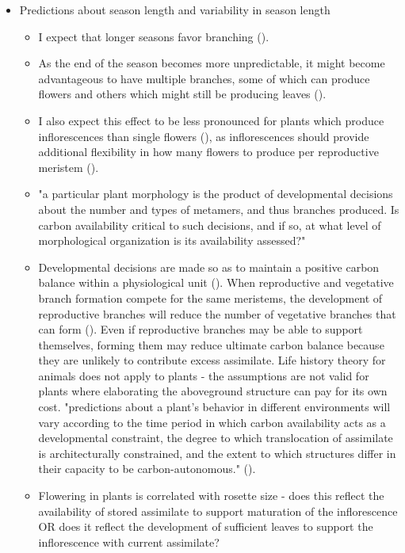 \documentclass[12pt, oneside,titlepage]{article}   	%
\begin{document}
\begin{itemize}
\item Predictions about season length and variability in season length
\begin{itemize}
\item I expect that longer seasons favor branching (\cite{geber1990a}). 
\item As the end of the season becomes more unpredictable, it might become advantageous to have multiple branches, some of which can produce flowers and others which might still be producing leaves (\cite{geber1990a}). 
\item  I also expect this effect to be less pronounced for plants which produce inflorescences than single flowers (\cite{bonser2006}), as inflorescences should provide additional flexibility in how many flowers to produce per reproductive meristem (\cite{bonser2006,salomonson1994}).
\item "a particular plant morphology is the product of developmental decisions about the number and types of metamers, and thus branches produced. Is carbon availability critical to such decisions, and if so, at what level of morphological organization is its availability assessed?" 
\item Developmental decisions are made so as to maintain a positive carbon balance within a physiological  unit (\cite{watson1984}). When reproductive and vegetative branch formation compete for the same meristems, the development of reproductive branches will reduce the number of vegetative branches that can form (\cite{watson1984a}). Even if reproductive branches may be able to support themselves, forming them may reduce ultimate carbon balance because they are unlikely to contribute excess assimilate. Life history theory for animals does not apply to plants - the assumptions are not valid for plants where elaborating the aboveground structure can pay for its own cost. "predictions about a plant's behavior in different environments will vary according to the time period in which carbon availability acts as a developmental constraint, the degree to which translocation of assimilate is architecturally constrained, and the extent to which structures differ in their capacity to be carbon-autonomous." (\cite{watson1984}).
\item Flowering in plants is correlated with rosette size - does this reflect the availability of stored assimilate to support maturation of the inflorescence OR does it reflect the development of sufficient leaves to support the inflorescence with current assimilate?
\end{itemize}


\end{itemize}
\end{document}
